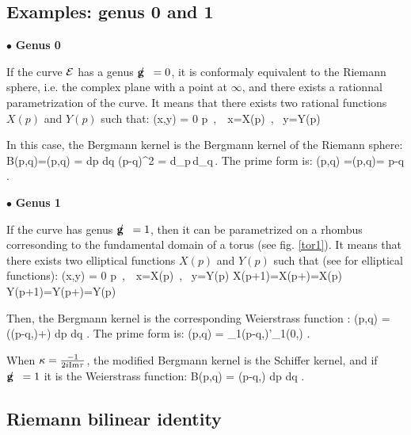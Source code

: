 \subsection{Examples: genus 0 and 1}

\noindent $\bullet$ {\bf Genus 0}

If the curve $\curve$ has a genus $\genus = 0$, it is conformaly equivalent to the Riemann sphere, i.e. the complex plane with a point at $\infty$, and there exists a rationnal parametrization of the curve. 
It means that there exists two rational functions $X(p)$ and $Y(p)$ such that:
\beq
\curve(x,y) = 0 \quad \leftrightarrow \quad \exists p\, , \,\, x=X(p)\, , \, y=Y(p)
\eeq

In this case, the Bergmann kernel is the Bergmann kernel of the Riemann sphere:
\beq
B(p,q)=\Bergmann(p,q) = {dp dq \over (p-q)^2} = d_p\,d_q\,.
\eeq
The prime form is:
\beq
\primef(p,q) =\underline\primef(p,q)= {p-q\over {}} .
\eeq

\noindent $\bullet$ {\bf Genus 1}

If the curve has genus $\genus=1$, then it can be parametrized on a rhombus corresonding to the fundamental domain of a torus (see fig. \ref{tor1}). 
It means that there exists two elliptical functions $X(p)$ and $Y(p)$ such that (see \cite{ellipticalf} for elliptical functions):
\bea
\curve(x,y) = 0 \quad \leftrightarrow \quad \exists p\, , \,\, x=X(p)\, , \, y=Y(p) \cr
X(p+1)=X(p+\tau)=X(p) \virg
Y(p+1)=Y(p+\tau)=Y(p) 
\eea

Then, the Bergmann kernel is the corresponding Weierstrass function \cite{ellipticalf}:
\beq
\Bergmann(p,q) = (\wp(p-q,\tau)+{\pi\over \Im\tau})\,\,dp dq .
\eeq
The prime form is:
\beq
\underline\primef(p,q) = {\theta_1(p-q,\tau)\over \theta'_1(0,\tau) } .
\eeq

When $\kappa={-1\over 2i \Im\tau}$, the modified Bergmann kernel is the Schiffer kernel, and if $\genus=1$ it is the Weierstrass function:
\beq
B(p,q) = \wp(p-q,\tau)\,\,dp dq .
\eeq




\subsection{Riemann bilinear identity}

